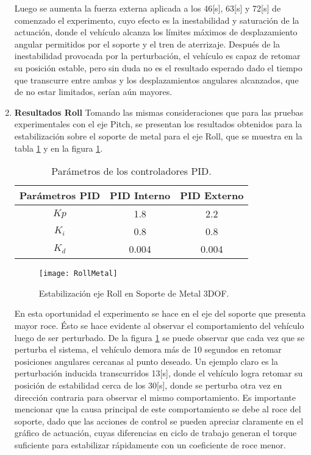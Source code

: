 \documentclass[\main/main.tex]{subfiles}
\begin{document}
\begin{enumerate}
	Luego se aumenta la fuerza externa aplicada a los 46{[}s{]}, 63{[}s{]}
	y 72{[}s{]} de comenzado el experimento, cuyo efecto es la inestabilidad
	y saturación de la actuación, donde el vehículo alcanza los límites
	máximos de desplazamiento angular permitidos por el soporte y el tren
	de aterrizaje. Después de la inestabilidad provocada por la perturbación,
	el vehículo es capaz de retomar su posición estable, pero sin duda
	no es el resultado esperado dado el tiempo que transcurre entre ambas
	y los desplazamientos angulares alcanzados, que de no estar limitados,
	serían aún mayores.

	\item \textbf{Resultados Roll}
	Tomando las mismas consideraciones que para las pruebas experimentales
	con el eje Pitch, se presentan los resultados obtenidos para la estabilización
	sobre el soporte de metal para el eje Roll, que se muestra en la tabla \ref{table: Parametros Roll Me} y en la figura \ref{fig:Estabilizacion-eje-Roll}.

	\begin{table}[H]
	\noindent \begin{centering}
	\begin{tabular}{|c|c|c|}
	\hline 
	Parámetros PID & PID Interno & PID Externo\tabularnewline
	\hline 
	\hline 
	$Kp$ & 1.8 & 2.2\tabularnewline
	\hline 
	$K_{i}$ & 0.8 & 0.8\tabularnewline
	\hline 
	$K_{d}$ & 0.004 & 0.004\tabularnewline
	\hline 
	\end{tabular}
	\par\end{centering}
	\caption{Parámetros de los controladores PID.}\label{table: Parametros Roll Me}
	\end{table}

	\begin{figure}[H]
	\noindent \begin{centering}
	\texttt{[image: RollMetal]}
	\par\end{centering}
	\caption{Estabilización eje Roll en Soporte de Metal 3DOF.\label{fig:Estabilizacion-eje-Roll}}
	\end{figure}

	En esta oportunidad el experimento se hace en el eje del soporte que
	presenta mayor roce. Ésto se hace evidente al observar el comportamiento
	del vehículo luego de ser perturbado. De la figura \ref{fig:Estabilizacion-eje-Roll}
	se puede observar que cada vez que se perturba el sistema, el vehículo
	demora más de 10 segundos en retomar posiciones angulares cercanas
	al punto deseado. Un ejemplo claro es la perturbación inducida transcurridos
	13{[}s{]}, donde el vehículo logra retomar su posición de estabilidad
	cerca de los 30{[}s{]}, donde se perturba otra vez en dirección contraria
	para observar el mismo comportamiento. Es importante mencionar que
	la causa principal de este comportamiento se debe al roce del soporte,
	dado que las acciones de control se pueden apreciar claramente en
	el gráfico de actuación, cuyas diferencias en ciclo de trabajo generan
	el torque suficiente para estabilizar rápidamente con un coeficiente
	de roce menor.


\end{enumerate}
\end{document}
